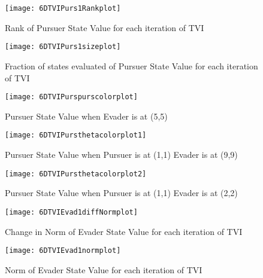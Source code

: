 \begin{figure}
\vspace{2.4in}
\centering
\texttt{[image: 6DTVIPurs1Rankplot]}
\caption{Rank of Pursuer State Value for each iteration of TVI}
\label{6DTVIPurs1Rankplot}
\end{figure}
\clearpage
\newpage

\begin{figure}
\vspace{2.4in}
\centering
\texttt{[image: 6DTVIPurs1sizeplot]}
\caption{Fraction of states evaluated of Pursuer State Value for each iteration of TVI}
\label{6DTVIPurs1sizeplot}
\end{figure}
\clearpage
\newpage

\begin{figure}
\vspace{2.4in}
\centering
\texttt{[image: 6DTVIPurspurscolorplot]}
\caption{Pursuer State Value when Evader is at (5,5)}
\label{6DTVIPurspurscolorplot}
\end{figure}
\clearpage
\newpage

\begin{figure}
\vspace{2.4in}
\centering
\texttt{[image: 6DTVIPursthetacolorplot1]}
\caption{Pursuer State Value when Pursuer is at (1,1) Evader is at (9,9) }
\label{6DTVIPursthetacolorplot1}
\end{figure}
\clearpage
\newpage

\begin{figure}
\vspace{2.4in}
\centering
\texttt{[image: 6DTVIPursthetacolorplot2]}
\caption{Pursuer State Value when Pursuer is at (1,1) Evader is at (2,2) }
\label{6DTVIPursthetacolorplot2}
\end{figure}
\clearpage
\newpage

\begin{figure}
\vspace{2.4in}
\centering
\texttt{[image: 6DTVIEvad1diffNormplot]}
\caption{Change in Norm of Evader State Value for each iteration of TVI}
\label{6DTVIEvad1diffNormplot}
\end{figure}
\clearpage
\newpage

\begin{figure}
\vspace{2.4in}
\centering
\texttt{[image: 6DTVIEvad1normplot]}
\caption{Norm of Evader State Value for each iteration of TVI}
\label{6DTVIEvad1normplot}
\end{figure}
\clearpage
\newpage

